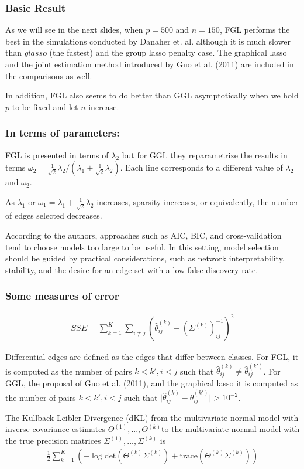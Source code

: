 \documentclass[t]{beamer}
\providecommand{\abs}[1]{\lvert#1\rvert}
\begin{document}
\begin{frame}
\frametitle{Basic Result}
As we will see in the next slides, when $p = 500$ and $n= 150$, FGL performs the best in the simulations conducted by Danaher et. al. although it is much slower than $glasso$ (the fastest) and the group lasso penalty case. The graphical lasso and the joint estimation method introduced by Guo et al. (2011)  are included in the comparisons as well. 
\bigskip
\pause

In addition, FGL also seems to do better than GGL asymptotically when we hold $p$ to be fixed and let $n$ increase.
\end{frame}
\begin{frame}
\frametitle{In terms of parameters:}

FGL is presented in terms of $\lambda_2$
but for GGL they reparametrize the results in terms $\omega_2 = \frac{1}{\sqrt{2}}\lambda_2/(
\lambda_1 + \frac{1}{\sqrt{2}}\lambda_2)$. Each line corresponds to a different value of $\lambda_2$ and $\omega_2$.
\smallskip
\pause

As $\lambda_1$ or $\omega_1=\lambda_1 + \frac{1}{\sqrt{2}}\lambda_2$ increases, sparsity increases, or equivalently, the number of edges selected decreases.
\smallskip
\pause

According to the authors, approaches such as AIC, BIC, and cross-validation tend to choose models too large to be useful. In this setting, model selection should be guided by practical considerations, such as network interpretability, stability, and the desire for an edge set with a low false discovery rate.
\end{frame}

\begin{frame}
\frametitle{Some measures of error}

\begin{align*}
SSE = \sum_{k=1}^K \sum_{i \not= j} (\hat{\theta}^{(k)}_{ij} - (\Sigma^{(k)})^{-1}_{ij})^2
\end{align*}
\bigskip
\pause

Differential edges are defined as the edges that differ between classes. For FGL, it is computed
as the number of pairs $k<k',i<j$ such that $\hat{\theta}^{(k)}_{ij}
\not= \hat{\theta}^{(k')}_{ij}$. For GGL, the proposal of Guo et al. (2011), and the graphical lasso
it is computed as the number of pairs $k<k',i<j$ such
that $\abs{\hat{\theta}^{(k)}_{ij}- \hat{\theta}^{(k')}_{ij}} >
10^{-2}$.
\bigskip
\pause

The Kullback-Leibler Divergence (dKL) from the multivariate normal model with inverse covariance estimates $\Theta^{(1)},...,\Theta^{(k)}$to the multivariate
normal model with the true precision matrices $\Sigma^{(1)},...,\Sigma^{(k)}$
is 
\begin{align*}
\frac{1}{2} \sum_{k=1}^K (-\log \text{det} (\Theta^{(k)}\Sigma^{(k)}) + \text{trace}(\Theta^{(k)}\Sigma^{(k)}))
\end{align*}

\end{frame}
\end{document}
